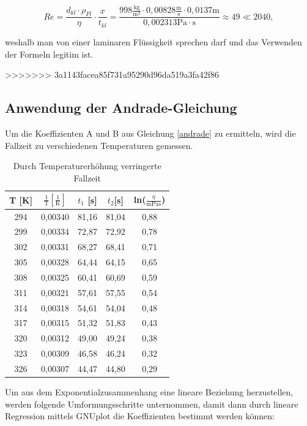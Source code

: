\begin{equation}
 Re = \frac{d_{kl}\cdot \rho_{Fl}}{\eta} \cdot \frac{x}{t_{kl}}=\frac{998\frac{\text{kg}}{\text{m}^3} \cdot 0,00828\frac{\text{m}}{\text{s}} \cdot 0,0137 \text{m}}{0,002313 \text{Pa}\cdot\text{s}} \approx 49 \ll 2040,
\end{equation}

weshalb man von einer laminaren Flüssigkeit sprechen darf und das Verwenden der Formeln legitim ist.

>>>>>>> 3a1143facea85f731a95290d96da519a3fa42f86
\subsection{Anwendung der Andrade-Gleichung}
Um die Koeffizienten A und B aus Gleichung \eqref{andrade} zu ermitteln, wird die Fallzeit zu verschiedenen Temperaturen gemessen.

\renewcommand{\arraystretch}{1.2}
\begin{table}[H]
 \begin{tabular}{c|c|c|c|c}
   T [K] & $\frac{1}{\text{T}}[\frac{1}{\text{K}}]$& $t_1$ [s] & $t_2$[s] & ln($\frac{\eta}{\text{mPas}}$)\\	
   \hline
294	&0,00340&	81,16&	81,04&	0,88 \\
299&	0,00334&	72,87&	72,92&	0,78\\
302&	0,00331&	68,27&	68,41&	0,71\\
305&	0,00328	&64,44&	64,15&	0,65\\
308&	0,00325	&60,41&	60,69&	0,59\\
311&	0,00321&	57,61&	57,55&	0,54\\
314&	0,00318&	54,61&	54,04&	0,48\\
317&	0,00315&	51,32&	51,83&	0,43\\
320&	0,00312&	49,00&	49,24&	0,38\\
323&	0,00309&	46,58&	46,24&	0,32\\
326&	0,00307&	44,47&	44,80&	0,29\\

 \end{tabular}
\caption{Durch Temperaturerhöhung verringerte Fallzeit}
\label{tabandrade}
\end{table}
\renewcommand{\arraystretch}{1}

Um aus dem Exponentialzusammenhang eine lineare Beziehung herzustellen, werden folgende Umformungsschritte unternommen, damit dann durch lineare Regression mittels GNUplot
die Koeffizienten bestimmt werden können:

